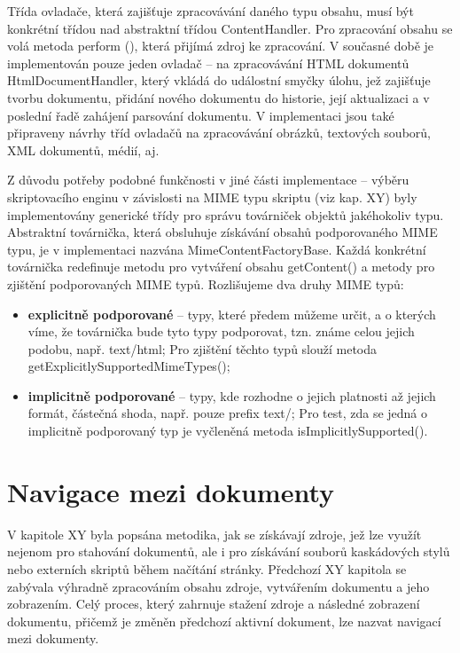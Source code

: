 Třída ovladače, která zajišťuje zpracovávání daného typu obsahu, musí být konkrétní třídou nad abstraktní třídou ContentHandler. Pro zpracování obsahu se volá metoda perform (), která přijímá zdroj ke zpracování. V současné době je implementován pouze jeden ovladač – na zpracovávání HTML dokumentů HtmlDocumentHandler, který vkládá do událostní smyčky úlohu, jež zajišťuje tvorbu dokumentu, přidání nového dokumentu do historie, její aktualizaci a v poslední řadě zahájení parsování dokumentu. V implementaci jsou také připraveny návrhy tříd ovladačů na zpracovávání obrázků, textových souborů, XML dokumentů, médií, aj.

Z důvodu potřeby podobné funkčnosti v jiné části implementace – výběru skriptovacího enginu v závislosti na MIME typu skriptu (viz kap. XY) byly implementovány generické třídy pro správu továrniček objektů jakéhokoliv typu. Abstraktní továrnička, která obsluhuje získávání obsahů podporovaného MIME typu, je v implementaci nazvána MimeContentFactoryBase. Každá konkrétní továrnička redefinuje metodu pro vytváření obsahu getContent() a metody pro zjištění podporovaných MIME typů. Rozlišujeme dva druhy MIME typů:

\begin{itemize}
  \item \textbf{explicitně podporované} -- typy, které předem můžeme určit, a o kterých víme, že továrnička bude tyto typy podporovat, tzn. známe celou jejich podobu, např. text/html; Pro zjištění těchto typů slouží metoda getExplicitlySupportedMimeTypes();
  \item \textbf{implicitně podporované} -- typy, kde rozhodne o jejich platnosti až jejich formát, částečná shoda, např. pouze prefix text/; Pro test, zda se jedná o implicitně podporovaný typ je vyčleněná metoda isImplicitlySupported().
\end{itemize}

\section{Navigace mezi dokumenty}
\label{Chapter.Implementation.DocumentNavigation}

V kapitole XY byla popsána metodika, jak se získávají zdroje, jež lze využít nejenom pro stahování dokumentů, ale i pro získávání souborů kaskádových stylů nebo externích skriptů během načítání stránky. Předchozí XY kapitola se zabývala výhradně zpracováním obsahu zdroje, vytvářením dokumentu a jeho zobrazením. Celý proces, který zahrnuje stažení zdroje a následné zobrazení dokumentu, přičemž je změněn předchozí aktivní dokument, lze nazvat navigací mezi dokumenty.

